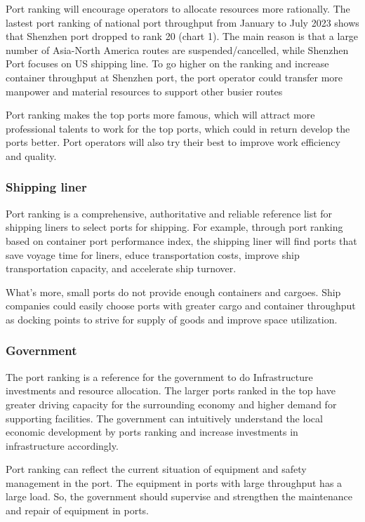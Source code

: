 \documentclass[preprint]{elsarticle}
\begin{document}
Port ranking will encourage operators to allocate resources more rationally. The lastest port ranking of national port throughput from January to July 2023 shows that Shenzhen port dropped to rank 20 (chart 1). The main reason is that a large number of Asia-North America routes are suspended/cancelled, while Shenzhen Port focuses on US shipping line. To go higher on the ranking and increase container throughput at Shenzhen port, the port operator could transfer more manpower and material resources to support other busier routes

Port ranking makes the top ports more famous, which will attract more professional talents to work for the top ports, which could in return develop the ports better. Port operators will also try their best to improve work efficiency and quality.
\subsubsection{Shipping liner}
Port ranking is a comprehensive, authoritative and reliable reference list for shipping liners to select ports for shipping.
For example, through port ranking based on container port performance index, the shipping liner will find ports that save voyage time for liners, educe transportation costs, improve ship transportation capacity, and accelerate ship turnover.

What's more, small ports do not provide enough containers and cargoes. Ship companies could easily choose ports with greater cargo and container throughput as docking points to strive for supply of goods and improve space utilization.
\subsubsection{Government}

The port ranking is a reference for the government to do Infrastructure investments and resource allocation. The larger ports ranked in the top have greater driving capacity for the surrounding economy and higher demand for supporting facilities. The government can intuitively understand the local economic development by ports ranking and increase investments in infrastructure accordingly.

Port ranking can reflect the current situation of equipment and safety management in the port. The equipment in ports with large throughput has a large load. So, the government should supervise and strengthen the maintenance and repair of equipment in ports.
\end{document}
